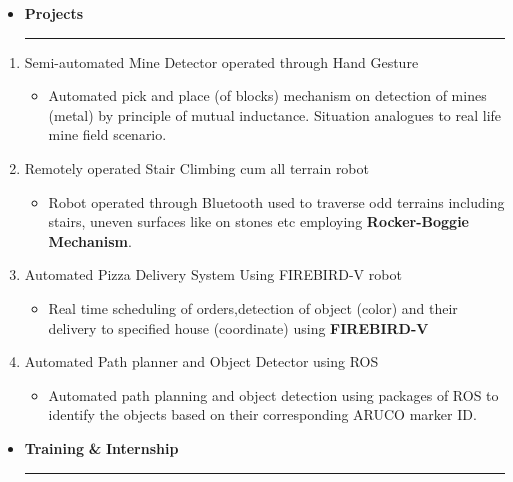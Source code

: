 \documentclass[a4paper]{article}
\begin{document}
\renewcommand{\labelitemi}{\texttt{[image: jnj.JPG]}}
\begin{itemize}
  \vspace{4ex}
  \item \textbf{\huge{P}}\textbf{\large rojects}
  {\color{mypink1}
  \rule{13.5cm}{0.5mm}}
 \end{itemize}
 \renewcommand{\labelitemi}{\textendash}
 \begin{enumerate}
     \item Semi-automated Mine Detector operated through Hand Gesture
     \begin{itemize}
       \item Automated pick and place (of blocks) mechanism on detection of mines (metal) by principle of mutual inductance. Situation analogues to real life mine field scenario.
     \end{itemize}
     
     \item Remotely operated Stair Climbing cum all terrain robot
      \begin{itemize}
       \item Robot operated through Bluetooth used to traverse odd terrains including stairs, uneven surfaces like on stones etc employing \textbf{Rocker-Boggie Mechanism}.
     \end{itemize}
     
     \item Automated Pizza Delivery System Using FIREBIRD-V robot
     \begin{itemize}
       \item Real time scheduling of orders,detection of object (color) and their delivery to specified house (coordinate) using \textbf{FIREBIRD-V}
     \end{itemize}
     
     \item Automated Path planner and Object Detector using ROS
     \begin{itemize}
       \item Automated path planning and object detection using packages of ROS to identify the objects based on their corresponding ARUCO marker ID.
     \end{itemize}
 \end{enumerate}
 \renewcommand{\labelitemi}{\texttt{[image: jnj.JPG]}}
\begin{itemize}
  \vspace{4ex}
  \item \textbf{\huge{T}}\textbf{\large raining} \textbf{\huge{\&}} \textbf{\huge{I}}\textbf{\large nternship}
  {\color{mypink1}
  \rule{10.5cm}{0.5mm}}
 \end{itemize}
 
\end{document}
